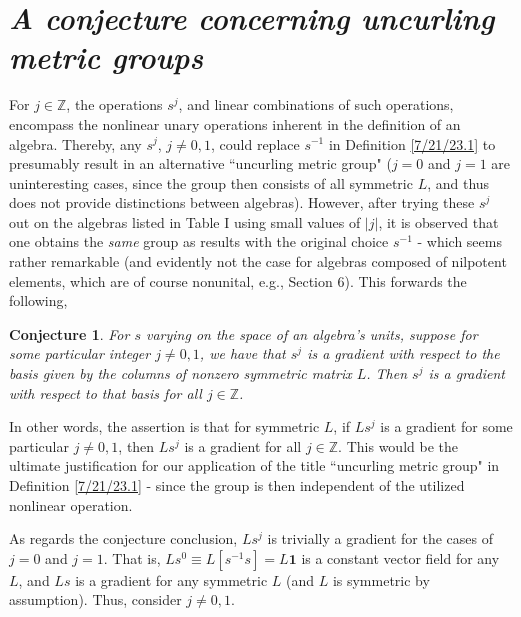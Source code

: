 \documentclass{amsart}
\numberwithin{equation}{section}
\newtheorem*{conjecture}{Conjecture}
\theoremstyle{definition}
\numberwithin{theorem}{section}
\begin{document}
\appendix

\section{\it A conjecture concerning uncurling metric groups}

For $j\in \mathbb{Z}$, the operations $s^j$, and linear combinations of such operations, encompass the nonlinear unary operations inherent in the definition of an algebra.  Thereby, any $s^j$, $j\ne 0,1$,  could replace $s^{-1}$ in Definition \ref{7/21/23.1} to presumably result in an alternative ``uncurling metric group" ($j=0$ and $j=1$ are uninteresting cases, since the group then consists of all symmetric $L$, and thus does not provide distinctions between algebras).  However, after trying these $s^j$ out on the algebras listed in Table I using small values of $|j|$, it is observed that one obtains the {\it same} group as results with the original choice $s^{-1}$ - which seems rather remarkable (and evidently not the case for algebras composed of nilpotent elements, which are of course nonunital, e.g., Section 6).  This forwards the following,

  \begin{conjecture}\label{8/16/23.1}
   For $s$ varying on the space of an algebra's units, suppose for some particular integer $j\ne 0,1$, we have that $s^j$ is a gradient with respect to the basis given by the columns of nonzero symmetric matrix $L$.  Then $s^j$ is a gradient with respect to that basis for all $j\in \mathbb{Z}$. 
   \end{conjecture}
  
In other words, the assertion is that for symmetric $L$, if $Ls^j$ is a gradient for some particular $j\ne 0,1$, then $Ls^j$ is a gradient for all $j\in \mathbb{Z}$.  This would be the ultimate justification for our application of the title ``uncurling metric group" in Definition \ref{7/21/23.1} - since the group is then independent of the utilized nonlinear operation.

 As regards the conjecture conclusion, $Ls^j$ is trivially a gradient for the cases of $j=0$ and $j=1$.  That is, $Ls^0 \equiv L[s^{-1}s] = L\mathbf{1}$ is a constant vector field for any $L$, and $Ls$ is a gradient for any symmetric $L$ (and $L$ is symmetric by assumption).  Thus, consider $j\ne 0,1$. 
 
\end{document}
